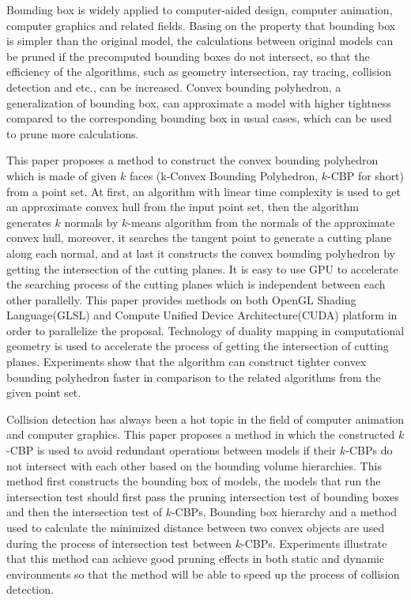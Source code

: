 \begin{eabstract} 
Bounding box is widely applied to computer-aided design, computer animation, computer graphics and related fields. 
Basing on the property that bounding box is simpler than the original model, the calculations between original models can be pruned if the precomputed bounding boxes do not intersect, so that the efficiency of the algorithms, such as geometry intersection, ray tracing, collision detection and etc., can be increased.
Convex bounding polyhedron, a generalization of bounding box,  can approximate a model with higher tightness compared to the corresponding bounding box in usual cases, which can be used to prune more calculations.

This paper proposes a method to construct the convex bounding polyhedron which is made of given $k$ faces (k-Convex Bounding Polyhedron, $k$-CBP for short) from a point set.
At first, an algorithm with linear time complexity is used to get an approximate convex hull from the input point set, 
then the algorithm generates $k$ normals by $k$-means algorithm from the normals of the approximate convex hull,  
moreover, it searches the tangent point to generate a cutting plane along each normal,
and at last it constructs the convex bounding polyhedron by getting the intersection of the cutting planes. 
It is easy to use GPU to accelerate the searching process of the cutting planes which is independent between each other parallelly.
This paper provides methods on both OpenGL Shading Language(GLSL) and Compute Unified Device Architecture(CUDA) platform in order to parallelize the proposal. 
Technology of duality mapping in computational geometry is used to accelerate the process of getting the intersection of cutting planes. 
Experiments show that the algorithm can construct tighter convex bounding polyhedron faster in comparison to the related algorithms from the given point set.

Collision detection has always been a hot topic in the field of computer animation and computer graphics. 
This paper proposes a method in which the constructed $k$-CBP is used to avoid redundant operations between models if their $k$-CBPs do not intersect with each other based on the bounding volume hierarchies.
This method first constructs the bounding box of models, the models that run the intersection test should first pass the pruning intersection test of bounding boxes and then the intersection test of $k$-CBPs. 
Bounding box hierarchy and a method used to calculate the minimized distance between two convex objects are used during the process of intersection test between $k$-CBPs. 
Experiments illustrate that this method can achieve good pruning effects in both static and dynamic environments so that the method will be able to speed up the process of collision detection.

\end{eabstract}

